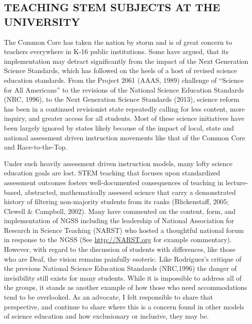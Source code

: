 \documentclass[11.5pt]{sig-alternate} %
\begin{document}
\begin{large}
\section*{TEACHING STEM SUBJECTS AT THE UNIVERSITY}

The Common Core has taken the nation by storm and is of great concern to teachers everywhere in K-16 public institutions.  Some have argued, that its implementation may detract significantly from the impact of the Next Generation Science Standards, which has followed on the heels of a host of revised science education standards.  From the Project 2061 (AAAS, 1989) challenge of “Science for All Americans” to the revisions of the National Science Education Standards (NRC, 1996), to the Next Generation Science Standards (2013), science reform has been in a continued revisionist state repeatedly calling for less content, more inquiry, and greater access for all students.   Most of these science initiatives have been largely ignored by states likely because of the impact of local, state and national assessment driven instruction movements like that of the Common Core and Race-to-the-Top.  

Under such heavily assessment driven instruction models, many lofty science education goals are lost.  STEM teaching that focuses upon standardized assessment outcomes fosters well-documented consequences of teaching in lecture-based, abstracted, mathematically assessed science that carry a demonstrated history of filtering non-majority students from its ranks (Blickenstaff, 2005; Clewell \& Campbell, 2002).  Many have commented on the content, form, and implementation of NGSS including the leadership of National Association for Research in Science Teaching (NARST) who hosted a thoughtful national forum in response to the NGSS (See \url{http://NARST.org} for example commentary).  However, with regard to the discussion of students with differences, like those who are Deaf, the vision remains painfully esoteric.  Like Rodriguez’s critique of the previous National Science Education Standards (NRC,1996) the danger of invisibility still exists for many students. While it is impossible to address all of the groups, it stands as another example of how those who need accommodations tend to be overlooked.  As an advocate, I felt responsible to share that perspective, and continue to share where this is a concern found in other models of science education and how exclusionary or inclusive, they may be. 


\end{large}
\end{document}
